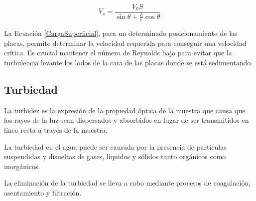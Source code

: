 \begin{equation}
	V_s = \frac{V_0 S}{\sin \theta + \frac{L}{e} \cos \theta}
	\label{CargaSuperficial}
\end{equation}

\noindent
\justify

La Ecuaci\'on \ref{CargaSuperficial}, para un determinado posicionamiento de las placas, permite determinar la velocidad requerida para conseguir una velocidad cr\'itica. Es crucial mantener el n\'umero de Reynolds bajo para evitar que la turbulencia levante los lodos de la cara de las placas donde se est\'a sedimentando.

\subsection{Turbiedad}

\noindent
\justify

La turbidez es la expresi\'on de la propiedad \'optica de la muestra que causa que los rayos de la luz sean dispersados y absorbidos en lugar de ser transmitidos en l\'inea recta a trav\'es de la muestra.

\noindent
\justify

La turbiedad en el agua puede ser causada por la presencia de part\'iculas suspendidas y disueltas de gases, l\'iquidos y s\'olidos tanto org\'anicos como inorg\'anicos.

\noindent
\justify

La eliminaci\'on de la turbiedad se lleva a cabo mediante procesos de coagulaci\'on, asentamiento y filtraci\'on.
